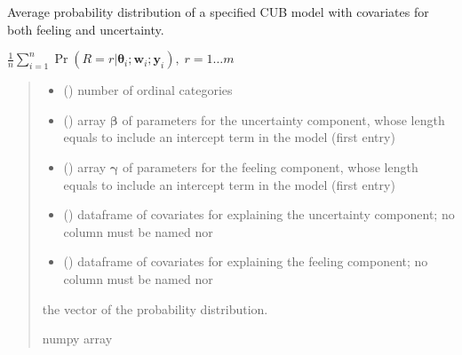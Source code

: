 \documentclass[letterpaper,10pt,english]{sphinxmanual}
\begin{document}
\begin{fulllineitems}
\label{\detokenize{cubmods:cubmods.cub_yw.pmf}}
\pysigstartsignatures
{}
\pysigstopsignatures
\sphinxAtStartPar
Average probability distribution of a specified CUB model 
with covariates for both feeling and uncertainty.

\sphinxAtStartPar
\(\frac{1}{n} \sum_{i=1}^n \Pr(R = r | \pmb\theta_i ; \pmb w_i; \pmb y_i),\; r=1 \ldots m\)
\begin{quote}\begin{description}
\begin{itemize}
\item {} 
\sphinxAtStartPar
{} () \textendash{} number of ordinal categories

\item {} 
\sphinxAtStartPar
{} () \textendash{} array \(\pmb \beta\) of parameters for the uncertainty component, whose length equals 
 to include an intercept term in the model (first entry)

\item {} 
\sphinxAtStartPar
{} () \textendash{} array \(\pmb \gamma\) of parameters for the feeling component, whose length equals 
 to include an intercept term in the model (first entry)

\item {} 
\sphinxAtStartPar
{} () \textendash{} dataframe of covariates for explaining the uncertainty component;
no column must be named  nor 

\item {} 
\sphinxAtStartPar
{} () \textendash{} dataframe of covariates for explaining the feeling component;
no column must be named  nor 

\end{itemize}

\sphinxAtStartPar
the vector of the probability distribution.

\sphinxAtStartPar
numpy array

\end{description}\end{quote}

\end{fulllineitems}
\end{document}
